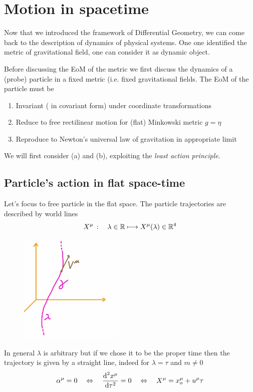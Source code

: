 \documentclass[../main/main.tex]{subfiles}
\begin{document}
\chapter {Motion in spacetime}



Now that we introduced the framework of Differential Geometry, we can come back to the description of dynamics of physical systems. One one identified the metric of gravitational field, one can consider it as dynamic object. 

Before discussing the EoM of the metric we first discuss the dynamics of a (probe) particle in a fixed metric (i.e. fixed gravitational fields.
The EoM of the particle must be
\begin{enumerate}[label=(\alph*)]
\item Invariant ( in covariant form) under coordinate transformations
\item Reduce to free rectilinear motion for (flat) Minkowski metric $g=\eta$
\item Reproduce to Newton's universal law of gravitation in appropriate limit
\end{enumerate}
We will first consider (a) and (b), exploiting the \emph{least action principle}.

\section{Particle's action in flat space-time}

Let's focus to free particle in the flat space. The particle trajectories are described by world lines
\[X^\mu\,:\quad\lambda\in\mathbb{R}\longmapsto X^\mu(\lambda)\in\mathbb{R}^4\]
\begin{figure}[H]
\centering
\includegraphics[width=5cm]{../img/world-line-particle-traject.jpg}
\end{figure}

In general $\lambda$ is arbitrary but if we chose it to be the proper time then the trajectory is given by a straight line, indeed for $\lambda=\tau$ and $m\neq0$
\[\alpha^\mu=0\quad\Leftrightarrow\quad\frac{\textup{d}^2 x^\mu}{\textup{d} \tau^2}=0\quad\Leftrightarrow\quad X^\mu=x_o^\mu+u^\mu\tau\]
\end{document}
